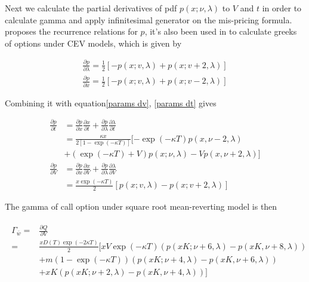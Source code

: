 Next we calculate the partial derivatives of pdf $p(x; \nu, \lambda)$ to $V$ and $t$ in order to calculate gamma and apply infinitesimal generator on the mis-pricing formula. \cite{cohen_noncentral_1988} proposes the recurrence relations for $p$, it's also been used in \cite{hossain_comparison_2019} to calculate greeks of options under CEV models, which is given by

\begin{equation}
    \begin{gathered}
        \frac{\partial p}{\partial \lambda}=\frac{1}{2}[-p(x ; v, \lambda)+p(x ; v+2, \lambda)] \\
        \frac{\partial p}{\partial x}=\frac{1}{2}[-p(x ; v, \lambda)+p(x ; v-2, \lambda)]
    \end{gathered}
\end{equation}



Combining it with equation\eqref{params dv}, \eqref{params dt} gives

\begin{equation}
    \begin{aligned}
        \frac{\partial p}{\partial t}&= \frac{\partial p}{\partial x}\frac{\partial x}{\partial t} + \frac{\partial p}{\partial \lambda} \frac{\partial \lambda}{\partial t} \\
        &= \frac{\kappa x }{2[1 - \exp(- \kappa T)]} [ - \exp(- \kappa T) p(x, \nu-2, \lambda)\\
        &+ (\exp(- \kappa T)+V) p(x ; \nu, \lambda) - Vp(x, \nu+2, \lambda)]\\
        \frac{\partial p}{\partial V} &= \frac{\partial p}{\partial x}\frac{\partial x}{\partial V} + \frac{\partial p}{\partial \lambda} \frac{\partial \lambda}{\partial V} \\
        &= \frac{x \exp(-\kappa T)}{2}[p(x ; v, \lambda)-p(x ; v+2, \lambda)]
    \end{aligned}
\end{equation}

The gamma of call option under square root mean-reverting model is then

\begin{equation}\label{gamma}
    \begin{aligned}
        \begin{aligned}
            \Gamma_{\bar{w}}= & \frac{\partial Q}{\partial V} \\
            =& \frac{x D(T) \exp(-2\kappa T)}{2} [
            xV \exp (-\kappa T) (p(xK; \nu+6, \lambda) - p(xK,\nu+8,\lambda)) \\
            &+m (1-\exp (-\kappa T)) (p(xK; \nu+4, \lambda)-p(xK,\nu+6,\lambda)) \\
            &+ xK (p(x K; \nu+2, \lambda)-p(xK,\nu+4,\lambda))]
            \end{aligned}
    \end{aligned}
\end{equation}

